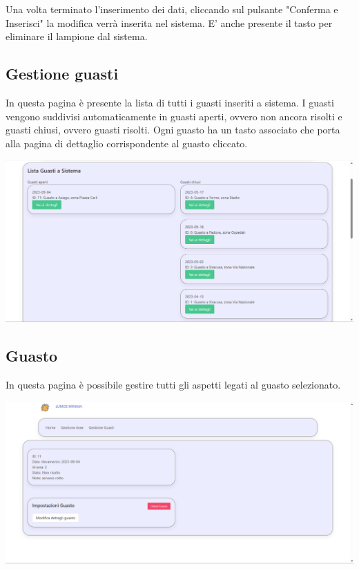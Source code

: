 \documentclass[9pt]{article}
\begin{document}
\begin{itemize}
Una volta terminato l'inserimento dei dati, cliccando sul pulsante "Conferma e Inserisci"
la modifica verrà inserita nel sistema.
E' anche presente il tasto per eliminare il lampione dal sistema.


\subsection{Gestione guasti}
In questa pagina è presente la lista di tutti i guasti inseriti a sistema.
I guasti vengono suddivisi automaticamente in guasti aperti, ovvero non ancora risolti e guasti chiusi, ovvero guasti risolti.
Ogni guasto ha un tasto associato che porta alla pagina di dettaglio corrispondente al guasto cliccato.

\begin{center}
	\includegraphics[scale=0.3]{Gestione_guasti.png}
\end{center}

\subsection{Guasto}

In questa pagina è possibile gestire tutti gli aspetti legati al guasto selezionato.

\begin{center}
	\includegraphics[scale=0.3]{Guasto.png}
\end{center}


\end{itemize}
\end{document}
